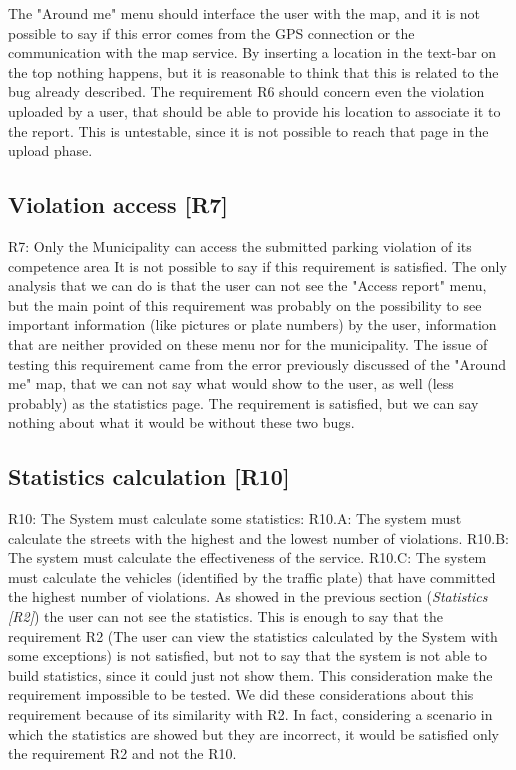 \documentclass[../ATD.tex]{subfiles}
\begin{document}
    The "Around me" menu should interface the user with the map, and it is not possible to say if this error comes from the GPS connection or the communication with the map service.
    By inserting a location in the text-bar on the top nothing happens, but it is reasonable to think that this is related to the bug already described.
    \newline
    The requirement R6 should concern even the violation uploaded by a user, that should be able to provide his location to associate it to the report.
    This is untestable, since it is not possible to reach that page in the upload phase.

    \subsection{Violation access [R7]}\label{subsec:violation-access}
    R7: Only the Municipality can access the submitted parking violation of its competence area
    \newline
    It is not possible to say if this requirement is satisfied.
    The only analysis that we can do is that the user can not see the "Access report" menu, but the main point of this requirement was probably on the possibility to see important information (like pictures or plate numbers) by the user, information that are neither provided on these menu nor for the municipality.
    The issue of testing this requirement came from the error previously discussed of the "Around me" map, that we can not say what would show to the user, as well (less probably) as the statistics page.
    The requirement is satisfied, but we can say nothing about what it would be without these two bugs.

    \subsection{Statistics calculation [R10]}\label{subsec:statistics-calculation}
    R10: The System must calculate some statistics:
    \newline
    R10.A: The system must calculate the streets with the highest and the lowest number of violations.
    \newline
    R10.B: The system must calculate the effectiveness of the service.
    \newline
    R10.C: The system must calculate the vehicles (identified by the traffic plate) that have committed the highest number of violations.
    \newline
    As showed in the previous section (\textit{Statistics [R2]}) the user can not see the statistics.
    This is enough to say that the requirement R2 (The user can view the statistics calculated by the System with some exceptions) is not satisfied, but not to say that the system is not able to build statistics, since it could just not show them.
    This consideration make the requirement impossible to be tested.
    \newline
    We did these considerations about this requirement because of its similarity with R2.
    In fact, considering a scenario in which the statistics are showed but they are incorrect, it would be satisfied only the requirement R2 and not the R10.
\end{document}
